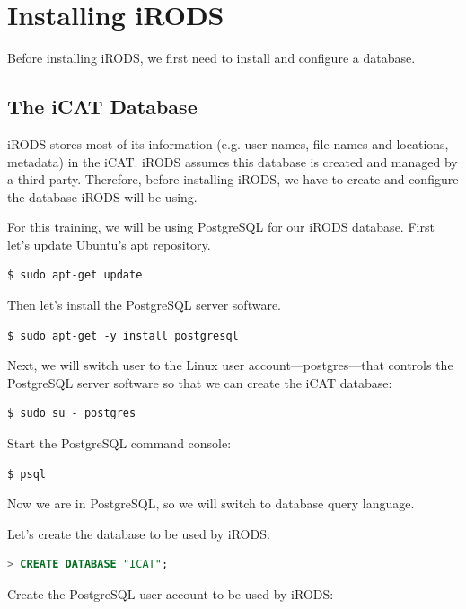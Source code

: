 \documentclass[10pt,oneside]{memoir}
\begin{document}
\chapter{Installing iRODS}

Before installing iRODS, we first need to install and configure a database.

\section{The iCAT Database}
iRODS stores most of its information (e.g. user names, file names and locations, metadata) in the iCAT. iRODS assumes this database is created and managed by a third party. Therefore, before installing iRODS, we have to create and configure the database iRODS will be using.


For this training, we will be using PostgreSQL for our iRODS database. First let's update Ubuntu's apt repository.

\begin{lstlisting}
$ sudo apt-get update
\end{lstlisting}

Then let's install the PostgreSQL server software.

\begin{lstlisting}
$ sudo apt-get -y install postgresql
\end{lstlisting}

Next, we will switch user to the Linux user account---postgres---that controls the PostgreSQL server software so that we can create the iCAT database:

\begin{lstlisting}
$ sudo su - postgres
\end{lstlisting}

Start the PostgreSQL command console:

\begin{lstlisting}
$ psql
\end{lstlisting}

\newpage

Now we are in PostgreSQL, so we will switch to database query language.

Let's create the database to be used by iRODS:

\begin{lstlisting}[language=sql]
> CREATE DATABASE "ICAT";
\end{lstlisting}

Create the PostgreSQL user account to be used by iRODS:
\end{document}
